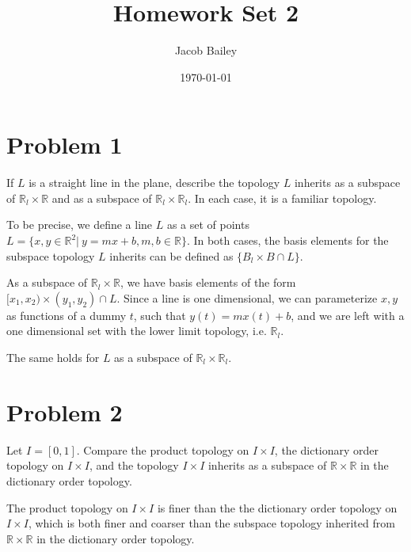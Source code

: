 \documentclass[11pt]{article}
\author{Jacob Bailey}
\date{\today}
\title{Homework Set 2}
\begin{document}
\maketitle

\section{Problem 1}
\label{sec:orgcb6239d}

If \(L\) is a straight line in the plane, describe the topology \(L\)
inherits as a subspace of \(\mathbb{R}_l\times\mathbb{R}\) and as a subspace of
\(\mathbb{R}_l\times\mathbb{R}_l\). In each case, it is a familiar topology.

To be precise, we define a line \(L\) as a set of points \(L = \{ x,y \in
\mathbb{R}^2 |\ y = mx + b, m,b \in \mathbb{R}\}\). In both cases, the
basis elements for the subspace topology \(L\) inherits can be defined
as \(\{ B_l\times B \cap L \}\).

As a subspace of \(\mathbb{R}_l\times\mathbb{R}\), we have basis
elements of the form \([x_1,x_2)\times(y_1,y_2)\cap L\). Since a line is
one dimensional, we can parameterize \(x,y\) as functions of a dummy
\(t\), such that \(y(t) = mx(t) + b\), and we are left with a one
dimensional set with the lower limit topology, i.e. \(\mathbb{R}_l\).

The same holds for \(L\) as a subspace of
\(\mathbb{R}_l\times\mathbb{R}_l\).

\section{Problem 2}
\label{sec:org40d59ba}

Let \(I = [0,1]\). Compare the product topology on \(I\times I\), the
dictionary order topology on \(I\times I\), and the topology \(I\times I\)
inherits as a subspace of \(\mathbb{R}\times\mathbb{R}\) in the dictionary order
topology.

The product topology on \(I\times I\) is finer than the the dictionary
order topology on \(I\times I\), which is both finer and coarser than
the subspace topology inherited from \(\mathbb{R}\times\mathbb{R}\) in
the dictionary order topology.
\end{document}
